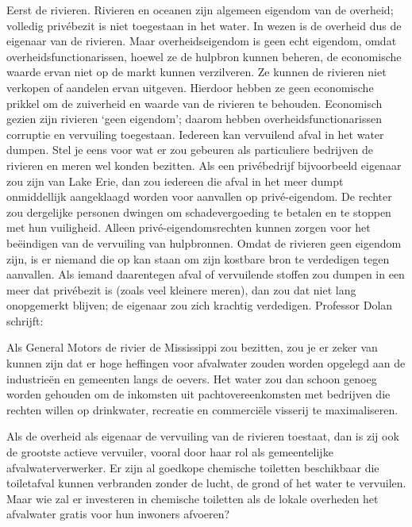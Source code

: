 \documentclass[
  a5paper,
  smalldemyvopaper,10pt,twoside,onecolumn,openright,extrafontsizes,hidelinks]{memoir}
\renewenvironment{quote}%
               {\list{}{\rightmargin=.6cm\leftmargin=.6cm}%
                \itshape \item[]}%
               {\endlist}
\begin{document}
Eerst de rivieren. Rivieren en oceanen zijn algemeen eigendom van de
overheid; volledig privébezit is niet toegestaan in het water. In wezen
is de overheid dus de eigenaar van de rivieren. Maar overheidseigendom
is geen echt eigendom, omdat overheidsfunctionarissen, hoewel ze de
hulpbron kunnen beheren, de economische waarde ervan niet op de markt
kunnen verzilveren. Ze kunnen de rivieren niet verkopen of aandelen
ervan uitgeven. Hierdoor hebben ze geen economische prikkel om de
zuiverheid en waarde van de rivieren te behouden. Economisch gezien zijn
rivieren `geen eigendom'; daarom hebben overheidsfunctionarissen
corruptie en vervuiling toegestaan. Iedereen kan vervuilend afval in het
water dumpen. Stel je eens voor wat er zou gebeuren als particuliere
bedrijven de rivieren en meren wel konden bezitten. Als een privébedrijf
bijvoorbeeld eigenaar zou zijn van Lake Erie, dan zou iedereen die afval
in het meer dumpt onmiddellijk aangeklaagd worden voor aanvallen op
privé-eigendom. De rechter zou dergelijke personen dwingen om
schadevergoeding te betalen en te stoppen met hun vuiligheid. Alleen
privé-eigendomsrechten kunnen zorgen voor het beëindigen van de
vervuiling van hulpbronnen. Omdat de rivieren geen eigendom zijn, is er
niemand die op kan staan om zijn kostbare bron te verdedigen tegen
aanvallen. Als iemand daarentegen afval of vervuilende stoffen zou
dumpen in een meer dat privébezit is (zoals veel kleinere meren), dan
zou dat niet lang onopgemerkt blijven; de eigenaar zou zich krachtig
verdedigen. Professor Dolan schrijft:

\begin{quote}
Als General Motors de rivier de Mississippi zou bezitten, zou je er
zeker van kunnen zijn dat er hoge heffingen voor afvalwater zouden
worden opgelegd aan de industrieën en gemeenten langs de oevers. Het
water zou dan schoon genoeg worden gehouden om de inkomsten uit
pachtovereenkomsten met bedrijven die rechten willen op drinkwater,
recreatie en commerciële visserij te maximaliseren.
\end{quote}

Als de overheid als eigenaar de vervuiling van de rivieren toestaat, dan
is zij ook de grootste actieve vervuiler, vooral door haar rol als
gemeentelijke afvalwaterverwerker. Er zijn al goedkope chemische
toiletten beschikbaar die toiletafval kunnen verbranden zonder de lucht,
de grond of het water te vervuilen. Maar wie zal er investeren in
chemische toiletten als de lokale overheden het afvalwater gratis voor
hun inwoners afvoeren?
\end{document}
